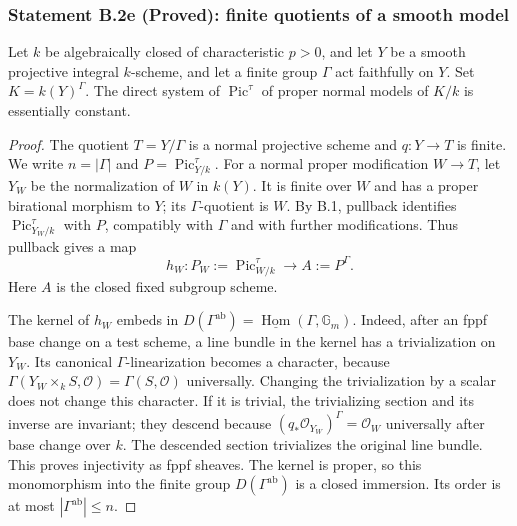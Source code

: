 \subsubsection*{Statement B.2e (Proved): finite quotients of a smooth model}
Let $k$ be algebraically closed of characteristic $p>0$, and let $Y$ be a smooth projective integral
$k$-scheme, and let a finite group $\Gamma$ act faithfully on $Y$.
Set $K=k(Y)^\Gamma$.  The direct system of
$\operatorname{Pic}^{\tau}$ of proper normal models of $K/k$ is
essentially constant.
\begin{proof}
The quotient $T=Y/\Gamma$ is a normal projective scheme and
$q:Y\to T$ is finite.  We write $n=|\Gamma|$ and
$P=\operatorname{Pic}^{\tau}_{Y/k}$.
For a normal proper modification $W\to T$, let $Y_W$ be the
normalization of $W$ in $k(Y)$.  It is finite over $W$ and has a
proper birational morphism to $Y$; its $\Gamma$-quotient is $W$.
By B.1, pullback identifies $\operatorname{Pic}^{\tau}_{Y_W/k}$
with $P$, compatibly with $\Gamma$ and with further modifications.
Thus pullback gives a map
\[
 h_W:P_W:=\operatorname{Pic}^{\tau}_{W/k}\longrightarrow
 A:=P^\Gamma.
\]
Here $A$ is the closed fixed subgroup scheme.

The kernel of $h_W$ embeds in
$D(\Gamma^{\mathrm{ab}})=\underline{\operatorname{Hom}}(\Gamma,\mathbb G_m)$.
Indeed, after an fppf base change on a test scheme, a line bundle in
the kernel has a trivialization on $Y_W$.  Its canonical
$\Gamma$-linearization becomes a character, because
$\Gamma(Y_W\times_kS,\mathcal O)=\Gamma(S,\mathcal O)$ universally.
Changing the trivialization by a scalar does not change this character.
If it is trivial, the trivializing section and its inverse are invariant;
they descend because $(q_*\mathcal O_{Y_W})^\Gamma=\mathcal O_W$
universally after base change over $k$.  The descended section
trivializes the original line bundle.  This proves injectivity as
fppf sheaves.  The kernel is proper, so this monomorphism into the
finite group $D(\Gamma^{\mathrm{ab}})$ is a closed immersion.
Its order is at most $|\Gamma^{\mathrm{ab}}|\le n$.


\end{proof}

